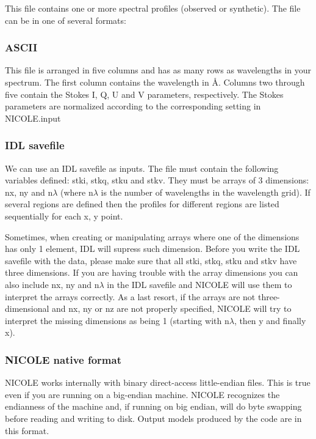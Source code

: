 This file contains one or more spectral profiles (observed or
synthetic). The file can be in one of several formats:

\subsubsection{ASCII}

This file is arranged in five columns and has as many rows as
wavelengths in your spectrum.  The first column contains the
wavelength in \AA . Columns two through five contain the Stokes I, Q,
U and V parameters, respectively. The Stokes parameters are normalized
according to the corresponding setting in NICOLE.input

\subsubsection{IDL savefile}

We can use an IDL savefile as inputs. The file must contain the
following variables defined: stki, stkq, stku and stkv. They must be
arrays of 3 dimensions: nx, ny and n$\lambda$
(where n$\lambda$ is the number of wavelengths in the wavelength
grid). If several regions are defined then the profiles for different
regions are listed sequentially for each x, y point.

Sometimes, when creating or manipulating arrays where one of the
dimensions has only 1 element, IDL will supress such dimension. Before
you write the IDL savefile with the data, please make sure that all
stki, stkq, stku and stkv have three dimensions. If you are having
trouble with the array dimensions you can also include nx, ny and
n$\lambda$ in the IDL savefile and NICOLE will use them to interpret
the arrays correctly. As a last resort, if the arrays are not
three-dimensional and nx, ny or nz are not properly specified, NICOLE
will try to interpret the missing dimensions as being 1 (starting with
n$\lambda$, then y and finally x).

\subsubsection{NICOLE native format}

NICOLE works internally with binary direct-access little-endian
files. This is true even if you are running on a big-endian
machine. NICOLE recognizes the endianness of the machine and, if
running on big endian, will do byte swapping before reading and
writing to disk. Output models produced by the code are in this format.

